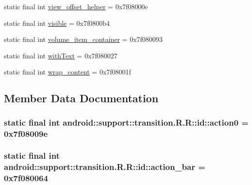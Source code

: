 \begin{CompactItemize}
\item 
static final int \hyperlink{classandroid_1_1support_1_1transition_1_1_r_1_1id_0d577c5d19ad3f5bc32f92c97c4c6f4c}{view\_\-offset\_\-helper} = 0x7f08000e
\item 
static final int \hyperlink{classandroid_1_1support_1_1transition_1_1_r_1_1id_510363633f6d9593d016412a5bf1ca49}{visible} = 0x7f0800b4
\item 
static final int \hyperlink{classandroid_1_1support_1_1transition_1_1_r_1_1id_21d2d46fae00ff6436e4c0553029a04f}{volume\_\-item\_\-container} = 0x7f080093
\item 
static final int \hyperlink{classandroid_1_1support_1_1transition_1_1_r_1_1id_6375ca80242632bd4c6af11a41d4195a}{withText} = 0x7f080027
\item 
static final int \hyperlink{classandroid_1_1support_1_1transition_1_1_r_1_1id_cf6c3acdc0771c6321d570c2d6765396}{wrap\_\-content} = 0x7f08001f
\end{CompactItemize}


\subsection{Member Data Documentation}
\hypertarget{classandroid_1_1support_1_1transition_1_1_r_1_1id_394c7da842831d7c64a1180403c27bb2}{
\subsubsection[{action0}]{\setlength{\rightskip}{0pt plus 5cm}static final int android::support::transition.R.R::id::action0 = 0x7f08009e}}
\label{classandroid_1_1support_1_1transition_1_1_r_1_1id_394c7da842831d7c64a1180403c27bb2}


\hypertarget{classandroid_1_1support_1_1transition_1_1_r_1_1id_0bd85da67315b7145445d118da172c83}{
\subsubsection[{action\_\-bar}]{\setlength{\rightskip}{0pt plus 5cm}static final int android::support::transition.R.R::id::action\_\-bar = 0x7f080064}}
\label{classandroid_1_1support_1_1transition_1_1_r_1_1id_0bd85da67315b7145445d118da172c83}


